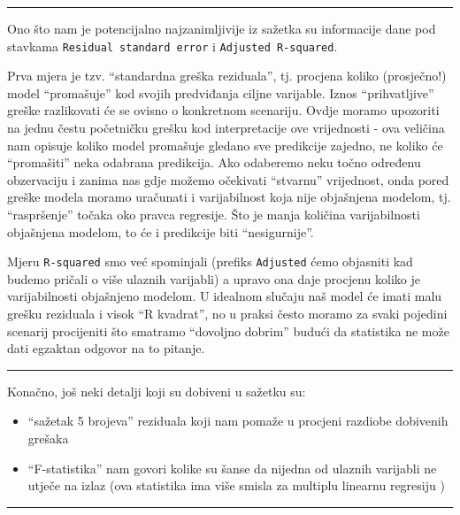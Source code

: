 \documentclass[]{book}
\providecommand{\tightlist}{%
  \setlength{\itemsep}{0pt}\setlength{\parskip}{0pt}}
\theoremstyle{definition}
\theoremstyle{definition}
\theoremstyle{definition}
\theoremstyle{remark}
\begin{document}
\begin{center}\rule{0.5\linewidth}{\linethickness}\end{center}

Ono što nam je potencijalno najzanimljivije iz sažetka su informacije
dane pod stavkama \texttt{Residual\ standard\ error} i
\texttt{Adjusted\ R-squared}.

Prva mjera je tzv. ``standardna greška reziduala'', tj. procjena koliko
(prosječno!) model ``promašuje'' kod svojih predviđanja ciljne
varijable. Iznos ``prihvatljive'' greške razlikovati će se ovisno o
konkretnom scenariju. Ovdje moramo upozoriti na jednu čestu početničku
grešku kod interpretacije ove vrijednosti - ova veličina nam opisuje
koliko model promašuje gledano sve predikcije zajedno, ne koliko će
``promašiti'' neka odabrana predikcija. Ako odaberemo neku točno
određenu obzervaciju i zanima nas gdje možemo očekivati ``stvarnu''
vrijednost, onda pored greške modela moramo uračunati i varijabilnost
koja nije objašnjena modelom, tj. ``raspršenje'' točaka oko pravca
regresije. Što je manja količina varijabilnosti objašnjena modelom, to
će i predikcije biti ``nesigurnije''.

Mjeru \texttt{R-squared} smo već spominjali (prefiks \texttt{Adjusted}
ćemo objasniti kad budemo pričali o više ulaznih varijabli) a upravo ona
daje procjenu koliko je varijabilnosti objašnjeno modelom. U idealnom
slučaju naš model će imati malu grešku reziduala i visok ``R kvadrat'',
no u praksi često moramo za svaki pojedini scenarij procijeniti što
smatramo ``dovoljno dobrim'' budući da statistika ne može dati egzaktan
odgovor na to pitanje.

\begin{center}\rule{0.5\linewidth}{\linethickness}\end{center}

Konačno, još neki detalji koji su dobiveni u sažetku su:

\begin{itemize}
\tightlist
\item
  ``sažetak 5 brojeva'' reziduala koji nam pomaže u procjeni razdiobe
  dobivenih grešaka
\item
  ``F-statistika'' nam govori kolike su šanse da nijedna od ulaznih
  varijabli ne utječe na izlaz (ova statistika ima više smisla za
  multiplu linearnu regresiju )
\end{itemize}

\begin{center}\rule{0.5\linewidth}{\linethickness}\end{center}
\end{document}
